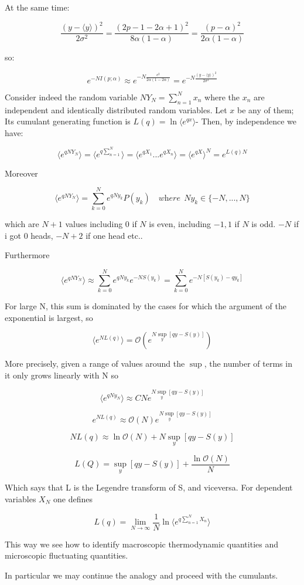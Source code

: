 \documentclass{article}
\begin{document}
At the same time:

$$ \frac{(y-\langle y \rangle)^2}{2 \sigma^2} = \frac{(2p-1-2\alpha+1)^2}{8\alpha (1-\alpha)} = \frac{(p-\alpha)^2}{2\alpha (1-\alpha)} $$

so:

$$ e^{-NI(p;\alpha)} \approx e^{-N \frac{\epsilon^2}{2 \alpha (1-2\alpha)}} = e^{-N \frac{(y-\langle y \rangle)^2}{2 \sigma^2}}$$

Consider indeed the random variable $NY_N = \sum_{n=1}^{N} x_n$ where the $x_n$ are independent and identically distributed random variables. Let $x$ be any of them; Its cumulant generating function is $L(q)= \ln \langle e^{qx} \rangle$- Then, by independence  we have:

$$\langle e^{qNY_N} \rangle = \langle e^{ q \sum_{n=1}^{N} } \rangle = \langle e^{qX_1} ... e^{qX_n} \rangle = \langle e^{qX} \rangle^N = e^{L(q) N} $$

Moreover 

$$\langle e^{qNY_N} \rangle  = \sum_{k=0}^{N} e^{qNy_k} P(y_k) \quad \textit{where} \ \ Ny_k \in \{ -N,...,N \}$$

which are $N+1$ values including 0 if $N$ is even, including $-1,1$ if $N$ is odd. $-N$ if i got $0$ heads, $-N+2$ if one head etc.. 

Furthermore

$$ \langle e^{qNY_N} \rangle \approx \sum_{k=0}^{N} e^{qNy_k} e^{-NS(y_k)} = \sum_{k=0}^{N} e^{-N[S(y_k)-qy_k]}$$

For large N, this sum is dominated by the cases for which the argument of the exponential is largest, so

$$\langle e^{NL(q)} \rangle = \mathcal{O}( e^{N \sup_{y}[q y - S(y)]}) $$

More precisely, given a range of values around the $\sup$, the number of terms in it only grows linearly with N so

$$ \langle e^{qNy_N} \rangle \approx CN  e^{N \sup_{y}[q y - S(y)]}$$

$$ e^{NL( q)} \approx \mathcal{O}(N) e^{N \sup_{y}[q y - S(y)]} $$

$$ NL(q) \approx \ln \mathcal{O}(N) + N \sup_{y}[q y - S(y)] $$

$$ L(Q) =  \sup_{y}[q y - S(y)] + \frac{ \ln \mathcal{O}(N) }{N}$$

Which says that L is the Legendre transform of S, and viceversa.
For dependent variables $X_N$ one defines

$$L(q) = \lim_{N \to \infty } \frac{1}{N} \ln \langle e^{q \sum_{n=1}^{N} X_n} \rangle $$

This way we see how to identify macroscopic thermodynamic quantities and microscopic fluctuating quantities.

In particular we may continue the analogy and proceed with the cumulants.
\end{document}
